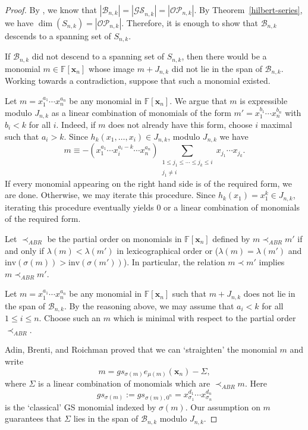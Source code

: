 \documentclass[ALCO,ThmDefs,published]{cedram}
\newcommand{\xx}{{\mathbf {x}}}
\newcommand{\FF}{{\mathbb{F}}}
\theoremstyle{plain}
\newcommand{\inv}{{\mathrm {inv}}}
\newcommand{\Des}{{\mathrm {Des}}}
\newcommand{\OP}{{\mathcal{OP}}}
\newcommand{\FF}{{\mathbb{F}}}
\newcommand{\BBB}{{\mathcal{B}}}
\newcommand{\GS}{{\mathcal{GS}}}
\newcommand{\xx}{{\mathbf {x}}}
\begin{document}
\begin{proof}
By \cite[Thm. 5.3]{HRS}, we know that $|\BBB_{n,k}| = |\GS_{n,k}| = |\OP_{n,k}|$.  By Theorem~\ref{hilbert-series}, we have
$\dim(S_{n,k}) = |\OP_{n,k}|$.  Therefore, it is enough to show that $\BBB_{n,k}$ descends to a spanning set of
$S_{n,k}$.

If $\BBB_{n,k}$ did not descend to a spanning set of $S_{n,k}$, then there would be a monomial 
$m \in \FF[\xx_n]$ whose image $m + J_{n,k}$ did not lie in the span of $\BBB_{n,k}$.
Working towards a contradiction, suppose that such a monomial 
existed.

Let $m = x_1^{a_1} \cdots x_n^{a_n}$ be any monomial in $\FF[\xx_n]$.  We argue that $m$ is expressible 
modulo $J_{n,k}$ as a linear combination of monomials of the form $m' = x_1^{b_1} \cdots x_n^{b_n}$
with $b_i < k$ for all $i$.  Indeed, if $m$ does not already have this form, choose $i$ maximal such that
$a_i > k$.  Since $h_k(x_1, \dots, x_i) \in J_{n,k}$, modulo $J_{n,k}$ we have
\begin{equation}
m \equiv -(x_1^{a_1} \cdots x_i^{a_i - k} \cdots x_n^{a_n}) \sum_{\substack{1 \leq j_1 \leq \cdots \leq j_k \leq i \\ j_1 \neq i}}
x_{j_1} \cdots x_{j_k}.
\end{equation}
If every monomial appearing on the right hand side is of the required form, we are done.  
Otherwise, we may iterate this procedure.  Since $h_k(x_1) = x_1^k \in J_{n,k}$, iterating this procedure 
eventually yields $0$ or a linear combination of monomials of the required form. 

Let $\prec_{ABR}$ be the partial order on monomials in $\FF[\xx_n]$ defined by $m \prec_{ABR} m'$ if and only if
$\lambda(m) < \lambda(m')$ in lexicographical order or ($\lambda(m) = \lambda(m')$ and
$\inv(\sigma(m)) > \inv(\sigma(m'))$).  In particular, the relation $m \prec m'$ implies $m \prec_{ABR} m'$.

Let $m = x_1^{a_1} \cdots x_n^{a_n}$ be any monomial in $\FF[\xx_n]$ such that $m + J_{n,k}$ does not 
lie in the span of $\BBB_{n,k}$.
By the reasoning above, we may assume that $a_i < k$ for all 
$1 \leq i \leq n$.   Choose such an $m$ which is minimal with respect to the partial order $\prec_{ABR}$.


Adin, Brenti, and Roichman \cite[Lem. 3.5]{ABR} proved that we can `straighten' the monomial $m$
and write
\begin{equation}
m = gs_{\sigma(m)} e_{\mu(m)}(\xx_n) - \Sigma,
\end{equation}
where $\Sigma$ is a linear combination of monomials which are $\prec_{ABR} m$.
Here 
\begin{equation}
gs_{\sigma(m)} := gs_{\sigma(m),0^n} = x_{\sigma_1}^{d_1}\cdots x_{\sigma_n}^{d_n}
\end{equation}
is the `classical' GS monomial indexed by $\sigma(m)$.
Our assumption on $m$ guarantees that $\Sigma$ lies in the span of $\BBB_{n,k}$ modulo $J_{n,k}$.


\end{proof}
\end{document}

